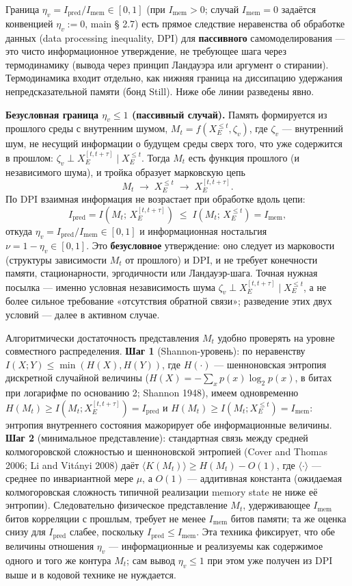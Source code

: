 \documentclass[pdflatex,sn-mathphys-ay]{sn-jnl}
\begin{document}
Граница \(\eta_v = I_{\text{pred}}/I_{\text{mem}} \in [0,1]\) (при \(I_{\text{mem}} > 0\); случай \(I_{\text{mem}} = 0\) задаётся конвенцией \(\eta_v := 0\), main § 2.7) есть прямое следствие неравенства об обработке данных (data processing inequality, DPI) для \textbf{пассивного} самомоделирования --- это чисто информационное утверждение, не требующее шага через термодинамику (вывода через принцип Ландауэра или аргумент о стирании). Термодинамика входит отдельно, как нижняя граница на диссипацию удержания непредсказательной памяти (бонд Still). Ниже обе линии разведены явно.

\textbf{Безусловная граница \(\eta_v \le 1\) (пассивный случай).} Память формируется из прошлого среды с внутренним шумом, \(M_t = f(X_E^{\le t}, \zeta_v)\), где \(\zeta_v\) --- внутренний шум, не несущий информации о будущем среды сверх того, что уже содержится в прошлом: \(\zeta_v \perp X_E^{[t, t+\tau]} \mid X_E^{\le t}\). Тогда \(M_t\) есть функция прошлого (и независимого шума), и тройка образует марковскую цепь \[M_t \;\to\; X_E^{\le t} \;\to\; X_E^{[t, t+\tau]}.\] По DPI взаимная информация не возрастает при обработке вдоль цепи: \[I_{\text{pred}} = I\!\left(M_t;\, X_E^{[t, t+\tau]}\right) \;\le\; I\!\left(M_t;\, X_E^{\le t}\right) = I_{\text{mem}},\] откуда \(\eta_v = I_{\text{pred}}/I_{\text{mem}} \in [0, 1]\) и информационная ностальгия \(\nu = 1 - \eta_v \in [0, 1]\). Это \textbf{безусловное} утверждение: оно следует из марковости (структуры зависимости \(M_t\) от прошлого) и DPI, и не требует конечности памяти, стационарности, эргодичности или Ландауэр-шага. Точная нужная посылка --- именно условная независимость шума \(\zeta_v \perp X_E^{[t, t+\tau]} \mid X_E^{\le t}\), а не более сильное требование «отсутствия обратной связи»; разведение этих двух условий --- далее в активном случае.

Алгоритмически достаточность представления \(M_t\) удобно проверять на уровне совместного распределения. \textbf{Шаг 1} (Shannon-уровень): по неравенству \(I(X; Y) \le \min(H(X), H(Y))\), где \(H(\cdot)\) --- шенноновская энтропия дискретной случайной величины (\(H(X) = -\sum_x p(x) \log_2 p(x)\), в битах при логарифме по основанию 2; Shannon 1948), имеем одновременно \(H(M_t) \ge I(M_t; X_E^{[t, t+\tau]}) = I_{\text{pred}}\) и \(H(M_t) \ge I(M_t; X_E^{\le t}) = I_{\text{mem}}\): энтропия внутреннего состояния мажорирует обе информационные величины. \textbf{Шаг 2} (минимальное представление): стандартная связь между средней колмогоровской сложностью и шенноновской энтропией (Cover and Thomas 2006; Li and Vitányi 2008) даёт \(\langle K(M_t)\rangle \ge H(M_t) - O(1)\), где \(\langle\cdot\rangle\) --- среднее по инвариантной мере \(\mu\), а \(O(1)\) --- аддитивная константа (ожидаемая колмогоровская сложность типичной реализации memory state не ниже её энтропии). Следовательно физическое представление \(M_t\), удерживающее \(I_{\text{mem}}\) битов корреляции с прошлым, требует не менее \(I_{\text{mem}}\) битов памяти; та же оценка снизу для \(I_{\text{pred}}\) слабее, поскольку \(I_{\text{pred}} \le I_{\text{mem}}\). Эта техника фиксирует, что обе величины отношения \(\eta_v\) --- информационные и реализуемы как содержимое одного и того же контура \(M_t\); сам вывод \(\eta_v \le 1\) при этом уже получен из DPI выше и в кодовой технике не нуждается.
\end{document}
